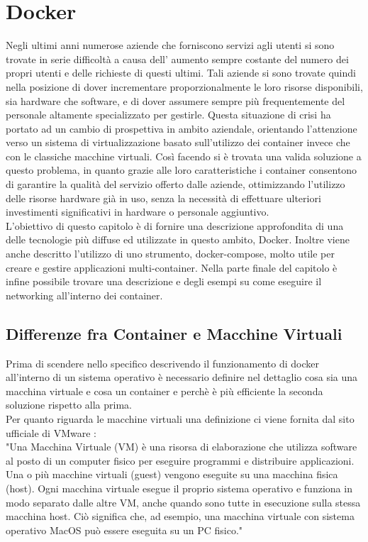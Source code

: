 \chapter{Docker} \label{ch:docker}

Negli ultimi anni numerose aziende che forniscono servizi agli utenti si sono trovate in serie difficoltà a causa dell' aumento sempre costante del numero
dei propri utenti e delle richieste di questi ultimi. Tali aziende si sono trovate quindi nella posizione di dover incrementare proporzionalmente le loro risorse disponibili, sia hardware che software, e di dover
assumere sempre più frequentemente del personale altamente specializzato per gestirle. Questa situazione di crisi ha portato ad un cambio di prospettiva in ambito aziendale, orientando l'attenzione verso un sistema di virtualizzazione
basato sull'utilizzo dei container invece che con le classiche macchine virtuali. Così facendo si è trovata una valida soluzione a questo problema, in quanto grazie alle loro caratteristiche i container consentono di garantire
la qualità del servizio offerto dalle aziende, ottimizzando l'utilizzo delle risorse hardware già in uso, senza la necessità di effettuare ulteriori investimenti significativi in hardware o personale aggiuntivo.\\
L'obiettivo di questo capitolo è di fornire una descrizione approfondita di una delle tecnologie più diffuse ed utilizzate in questo ambito, Docker\cite{docker-docs}. Inoltre viene anche descritto l'utilizzo di uno strumento, docker-compose, molto utile per 
creare e gestire applicazioni multi-container. Nella parte finale del capitolo è infine possibile trovare una descrizione e degli esempi su come eseguire il networking all'interno dei container.

\section{Differenze fra Container e Macchine Virtuali} 

Prima di scendere nello specifico descrivendo il funzionamento di docker all'interno di un sistema operativo è necessario definire nel dettaglio cosa sia una macchina virtuale e cosa un container e perchè è più efficiente la seconda soluzione rispetto alla prima.\\
Per quanto riguarda le macchine virtuali una definizione ci viene fornita dal sito ufficiale di VMware \cite{vmware}:\\
"Una Macchina Virtuale (VM) è una risorsa di elaborazione che utilizza software al posto di un computer fisico per eseguire programmi e distribuire applicazioni. Una o più macchine virtuali (guest) vengono eseguite su una macchina fisica (host). 
Ogni macchina virtuale esegue il proprio sistema operativo e funziona in modo separato dalle altre VM, anche quando sono tutte in esecuzione sulla stessa macchina host. Ciò significa che, ad esempio, una macchina virtuale con sistema operativo MacOS può essere eseguita su un PC fisico."\\

